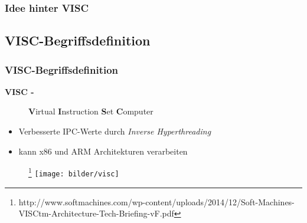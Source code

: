 \documentclass[xcolor=dvipsnames]{beamer}
\begin{document}
\begin{frame}
	\frametitle{Idee hinter VISC}
	\begin{figure}%
	
	\end{figure}
\end{frame}


\subsection{VISC-Begriffsdefinition}
\begin{frame}
\frametitle{VISC-Begriffsdefinition}
\begin{description}
\item [\textbf{VISC -}] \textbf{V}irtual \textbf{I}nstruction \textbf{S}et \textbf{C}omputer
\end{description}
\begin{itemize}
\item Verbesserte IPC-Werte durch \emph{Inverse Hyperthreading}
	\item kann x86 und ARM Architekturen verarbeiten
\end{itemize}
\begin{figure}\footnote{http://www.softmachines.com/wp-content/uploads/2014/12/Soft-Machines-VISCtm-Architecture-Tech-Briefing-vF.pdf}
\texttt{[image: bilder/visc]}
\end{figure}
\end{frame}

\end{document}
